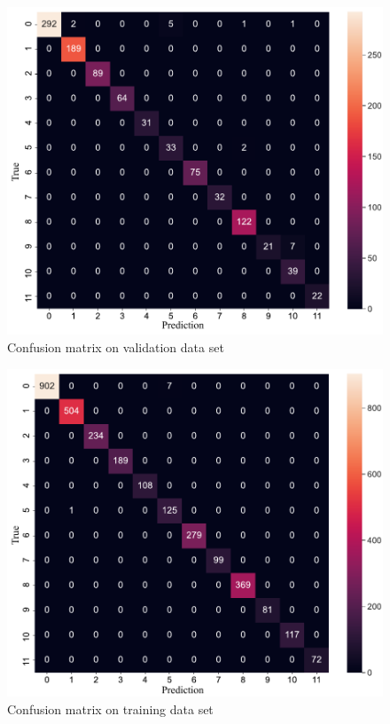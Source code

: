 \clearpage
\begin{figure}[H]
    \centering
    \includegraphics[width=.74\textwidth]{evaluation/imgs/5-confusion_matrix_val.pdf}
    \caption{Confusion matrix on validation data set}
    \label{fig:5-confusion_matrix_val}
\end{figure}

\begin{figure}[H]
    \centering
    \includegraphics[width=.74\textwidth]{evaluation/imgs/5-confusion_matrix_train.pdf}
    \caption{Confusion matrix on training data set}
    \label{fig:5-confusion_matrix_train}
\end{figure}

